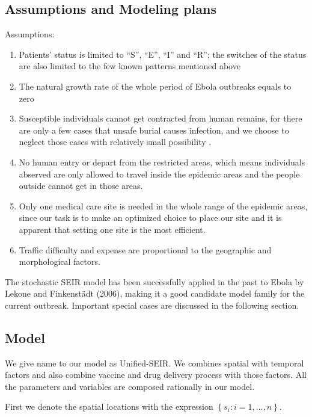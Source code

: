 \documentclass[12pt]{article}
\begin{document}
\subsection{Assumptions and Modeling plans}
Assumptions: 
\begin{enumerate}
\item Patients' status is limited to ``S'', ``E'', ``I'' and ``R''; the switches of the status are also limited to the few known patterns mentioned above
\item The natural growth rate of the whole period of Ebola outbreaks equals to zero
\item Susceptible individuals cannot get contracted from human remains, for there are only a few cases that unsafe burial causes infection, and we choose to neglect those cases with relatively small possibility \cite{Sitrep}.
\item No human entry or depart from the restricted areas, which means individuals abserved are only allowed to travel inside the epidemic areas and the people outside cannot get in those areas.
\item Only one medical care site is needed in the whole range of the epidemic areas, since our task is to make an optimized choice to place our site and it is apparent that setting one site is the most efficient.
\item Traffic difficulty and expense are proportional to the geographic and morphological factors. 
\end{enumerate}
 


The stochastic SEIR model has been successfully applied in the past to Ebola by Lekone and Finkenst{\"a}dt (2006), making it a good candidate model family for the current outbreak. 
Important special cases are discussed in the following section.



\subsection{Model}

We give name to our model as Unified-SEIR. We combines spatial with temporal factors and also combine vaccine and drug delivery process with those factors. All the parameters and variables are composed rationally in our model. 

First we denote the spatial locations with the expression $\left\{s_i : i = 1, ...,n \right\}$.
\end{document}
